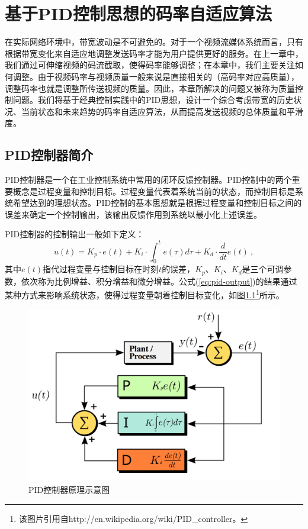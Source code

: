 \chapter{基于PID控制思想的码率自适应算法}

在实际网络环境中，带宽波动是不可避免的。对于一个视频流媒体系统而言，只有根据带宽变化来自适应地调整发送码率才能为用户提供更好的服务。在上一章中，我们通过可伸缩视频的码流截取，使得码率能够调整；在本章中，我们主要关注如何调整。由于视频码率与视频质量一般来说是直接相关的（高码率对应高质量），调整码率也就是调整所传送视频的质量。因此，本章所解决的问题又被称为质量控制问题。我们将基于经典控制实践中的PID思想，设计一个综合考虑带宽的历史状况、当前状态和未来趋势的码率自适应算法，从而提高发送视频的总体质量和平滑度。

\section{PID控制器简介}

PID控制器是一个在工业控制系统中常用的闭环反馈控制器。PID控制中的两个重要概念是过程变量和控制目标。过程变量代表着系统当前的状态，而控制目标是系统希望达到的理想状态。PID控制的基本思想就是根据过程变量和控制目标之间的误差来确定一个控制输出，该输出反馈作用到系统以最小化上述误差。

PID控制器的控制输出一般如下定义：
\begin{equation}
\label{eq:pid-output}
u(t) = {K_p} \cdot e(t) + {K_i} \cdot \int_0^t {e(\tau )d\tau }  + {K_d} \cdot \frac{d}{{dt}}e(t) \: ,
\end{equation}
其中$e(t)$指代过程变量与控制目标在时刻$t$的误差，$K_p$、$K_i$、$K_d$是三个可调参数，依次称为比例增益、积分增益和微分增益。公式(\ref{eq:pid-output})的结果通过某种方式来影响系统状态，使得过程变量朝着控制目标变化，如图\ref{fig:18}\footnote{该图片引用自http://en.wikipedia.org/wiki/PID\_controller。}所示。

\begin{figure}[h]
	\centering
	\includegraphics[width = 0.8\linewidth]{clip/18.png}
	\caption{PID控制器原理示意图\label{fig:18}}
\end{figure}

